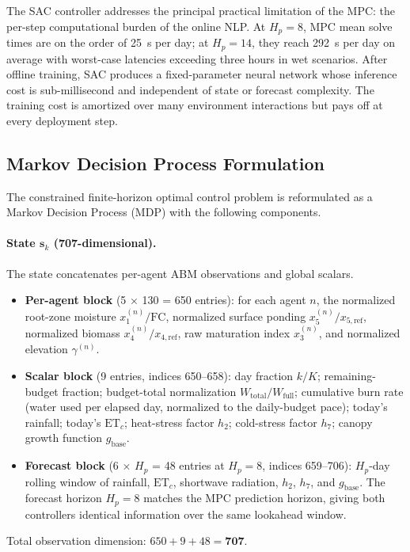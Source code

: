 The SAC controller addresses the principal practical limitation of the MPC:
the per-step computational burden of the online NLP. At $H_p = 8$, MPC mean
solve times are on the order of 25~s per day; at $H_p = 14$, they reach
292~s per day on average with worst-case latencies exceeding three hours in
wet scenarios. After offline training, SAC produces a fixed-parameter neural
network whose inference cost is sub-millisecond and independent of state or
forecast complexity. The training cost is amortized over many environment
interactions but pays off at every deployment step.

\subsection{Markov Decision Process Formulation}
\label{ssec:ctrl-sac-mdp}

The constrained finite-horizon optimal control problem is reformulated as a
Markov Decision Process (MDP) with the following components.

\paragraph{State $\mathbf{s}_k$ (707-dimensional).}
The state concatenates per-agent ABM observations and global scalars.
\begin{itemize}
  \item \textbf{Per-agent block} (5 $\times$ 130 = 650 entries): for each
    agent $n$, the normalized root-zone moisture $x_1^{(n)}/\mathrm{FC}$,
    normalized surface ponding $x_5^{(n)}/x_{5,\mathrm{ref}}$, normalized
    biomass $x_4^{(n)}/x_{4,\mathrm{ref}}$, raw maturation index $x_3^{(n)}$,
    and normalized elevation $\gamma^{(n)}$.
  \item \textbf{Scalar block} (9 entries, indices 650--658): day fraction
    $k/K$; remaining-budget fraction; budget-total normalization
    $W_{\mathrm{total}}/W_{\mathrm{full}}$; cumulative burn rate (water
    used per elapsed day, normalized to the daily-budget pace); today's
    rainfall; today's $\mathrm{ET}_c$; heat-stress factor $h_2$;
    cold-stress factor $h_7$; canopy growth function $g_{\mathrm{base}}$.
  \item \textbf{Forecast block} (6 $\times$ $H_p$ = 48 entries at
    $H_p = 8$, indices 659--706): $H_p$-day rolling window of rainfall,
    $\mathrm{ET}_c$, shortwave radiation, $h_2$, $h_7$, and $g_{\mathrm{base}}$.
    The forecast horizon $H_p = 8$ matches the MPC prediction horizon,
    giving both controllers identical information over the same lookahead
    window.
\end{itemize}
Total observation dimension: $650 + 9 + 48 = \mathbf{707}$.


